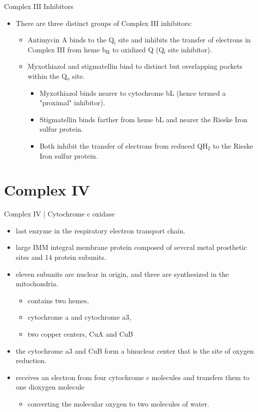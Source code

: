 \documentclass[presentation, smaller]{beamer}
\begin{document}
\begin{frame}[label={sec:org2603fba}]{Complex III Inhibitors}
\begin{itemize}
\item There are three distinct groups of Complex III inhibitors:
\begin{itemize}
\item Antimycin A binds to the Q\(_{\text{i}}\) site and inhibits the transfer of electrons in Complex III from heme b\(_{\text{H}}\) to oxidized Q (Q\(_{\text{i}}\) site inhibitor).
\item Myxothiazol and stigmatellin bind to distinct but overlapping pockets within the Q\(_{\text{o}}\) site.
\begin{itemize}
\item Myxothiazol binds nearer to cytochrome bL (hence termed a "proximal" inhibitor).
\item Stigmatellin binds farther from heme bL and nearer the Rieske Iron sulfur protein.
\item Both inhibit the transfer of electrons from reduced QH\(_{\text{2}}\) to the Rieske Iron sulfur protein.
\end{itemize}
\end{itemize}
\end{itemize}
\end{frame}

\section{Complex IV}
\label{sec:org56507d9}
\begin{frame}[label={sec:org925952f}]{Complex IV | Cytochrome c oxidase}
\begin{itemize}
\item last enzyme in the respiratory electron transport chain.
\item large IMM integral membrane protein composed of several metal prosthetic sites and 14 protein subunits.
\item eleven subunits are nuclear in origin, and three are synthesized in the mitochondria. 
\begin{itemize}
\item contains two hemes,
\item cytochrome a and cytochrome a3,
\item two copper centers, CuA and CuB
\end{itemize}
\item the cytochrome a3 and CuB form a binuclear center that is the site of oxygen reduction.
\item receives an electron from four cytochrome c molecules and transfers them to one dioxygen molecule
\begin{itemize}
\item converting the molecular oxygen to two molecules of water.
\end{itemize}
\end{itemize}

\centering
\small
{}
\end{frame}
\end{document}
